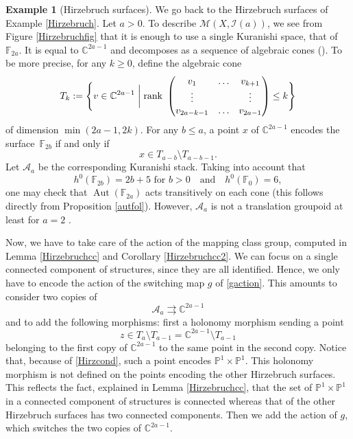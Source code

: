 \documentclass[JEP,XML,SOM,Unicode]{cedram}
\let\mathcal\mathscr
\DeclareMathOperator{\Aut}{Aut}
\theoremstyle{plain}
\theoremstyle{definition}
\newtheorem{example}[theorem]{Example}
\theoremstyle{remark}
\numberwithin{equation}{section}
\newcommand{\CC}{{\mathbb{C}}}
\newcommand{\cI}{\mathcal{I}}
\begin{document}
\begin{example}[Hirzebruch surfaces]
\label{Hirzebruchbis}
We go back to the Hirzebruch surfaces of Example \ref{Hirzebruch}. Let $a>0$. To describe $\mathcal M(X,\cI (a))$, we see from Figure \ref{Hirzebruchfig} that it is enough to use a single Kuranishi space, that of $\mathbb F_{2a}$. It is equal to $\CC^{2a-1}$ and decomposes as a sequence of algebraic cones (\cf \cite[p.\,21]{Cat}). To be more precise, for any $k\geq 0$, define the algebraic cone
\begin{equation}
\label{Tk}
T_k:=\Biggl\{v\in\CC^{2a-1}\biggm| \text{rank }
\begin{pmatrix}
v_1 &\hdots &v_{k+1}\cr
\vdots &&\vdots\cr
v_{2a-k-1} &\hdots &v_{2a-1}
\end{pmatrix}
\leq k
\Biggr \}
\end{equation}
of dimension $\min (2a-1, 2k)$. For any $b\leq a$, a point $x$ of $\CC^{2a-1}$ encodes the surface~$\mathbb F_{2b}$ if and only if
\begin{equation}
\label{Hirzcond}
x\in T_{a-b}\setminus T_{a-b-1}.
\end{equation}
Let $\mathcal A_a$ be the corresponding Kuranishi stack. Taking into account that
\begin{equation}
\label{hirzconst}
h^0(\mathbb F_{2b})=2b+5\text{ for }b>0\quad\text{and}\quad h^0(\mathbb F_0)=6,
\end{equation}
one may check that $\Aut(\mathbb F_{2a})$ acts transitively on each cone (this follows directly from Proposition \ref{autfol}). However, $\mathcal A_a$ is not a translation groupoid at least for $a=2$ \cite{An}.

Now, we have to take care of the action of the mapping class group, computed in Lemma \ref{Hirzebruchcc} and Corollary \ref{Hirzebruchcc2}. We can focus on a single connected component of structures, since they are all identified. Hence, we only have to encode the action of the switching map $g$ of \eqref{gaction}. This amounts to consider two copies of
\begin{equation}
\label{hirz12}
\mathcal A_a\rightrightarrows \CC^{2a-1}
\end{equation}
and to add the following morphisms: first a holonomy morphism sending a point
\begin{equation}
\label{hirzglu1}
z\in T_a\setminus T_{a-1}=\CC^{2a-1}\setminus T_{a-1}
\end{equation}
belonging to the first copy of $\CC^{2a-1}$ to the same point in the second copy. Notice that, because of \eqref{Hirzcond}, such a point encodes $\mathbb P^1\times\mathbb P^1$. This holonomy morphism is not defined on the points encoding the other Hirzebruch surfaces. This reflects the fact, explained in Lemma \ref{Hirzebruchcc}, that the set of $\mathbb P^1\times\mathbb P^1$ in a connected component of structures is connected whereas that of the other Hirzebruch surfaces has two connected components. Then we add the action of $g$, which switches the two copies of $\CC^{2a-1}$.


\end{example}
\end{document}
